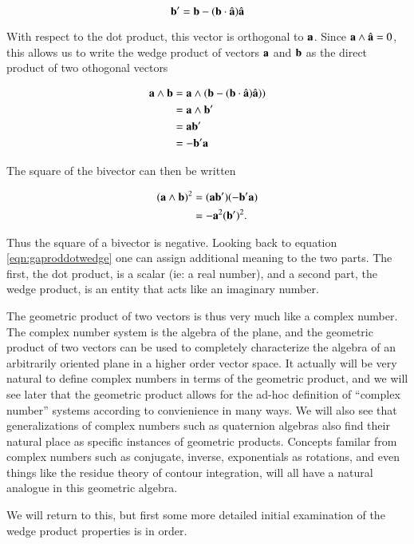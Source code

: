 \documentclass{article}      %
\begin{document}
\[
\mathbf{b}' = \mathbf{b} - (\mathbf{b} \cdot \hat{\mathbf{a}})\hat{\mathbf{a}}
\]

With respect to the dot product, this vector is orthogonal to $\mathbf{a}$.  Since $\mathbf{a} \wedge \hat{\mathbf{a}} = 0$, this allows us to 
write the wedge product of vectors $\mathbf{a}$ and $\mathbf{b}$ as the direct product of two othogonal vectors

\begin{align*}
\mathbf{a} \wedge \mathbf{b} 
&= \mathbf{a} \wedge (\mathbf{b} - (\mathbf{b} \cdot \hat{\mathbf{a}})\hat{\mathbf{a}})) \\
&= \mathbf{a} \wedge \mathbf{b}' \\
&= \mathbf{a} \mathbf{b}' \\
&= -\mathbf{b}' \mathbf{a} \\
\end{align*}

The square of the bivector can then be written

\begin{align*}
(\mathbf{a} \wedge \mathbf{b})^2
&= (\mathbf{a} \mathbf{b}')(-\mathbf{b}'\mathbf{a}) \\
&= -\mathbf{a}^2 (\mathbf{b}')^2.
\end{align*}

Thus the square of a bivector is negative.  Looking back to equation \ref{eqn:gaproddotwedge} one can assign additional meaning to the two parts.  The first, the dot product, is a scalar (ie: a real number), and a second part, the wedge product, is an entity that acts like an imaginary number.

The geometric product of two vectors is thus very much like a complex number.  The complex number system
is the algebra of the plane, and the geometric product of two vectors can be used to completely characterize the algebra of an arbitrarily oriented plane in a higher
order vector space.  It actually will be very natural to define complex numbers in terms of the geometric product, and we will see later that
the geometric product allows for the ad-hoc definition of ``complex number'' systems according to convienience in many ways.  
We will also see that generalizations of complex numbers such as quaternion algebras also find their natural place as specific instances of geometric products.
Concepts familar from
complex numbers such as conjugate, inverse, exponentials as rotations, and even things like the residue theory of contour integration, will all have a natural
analogue in this geometric algebra.

We will return to this, but first some more detailed initial examination of the wedge product properties is in order.
\end{document}
